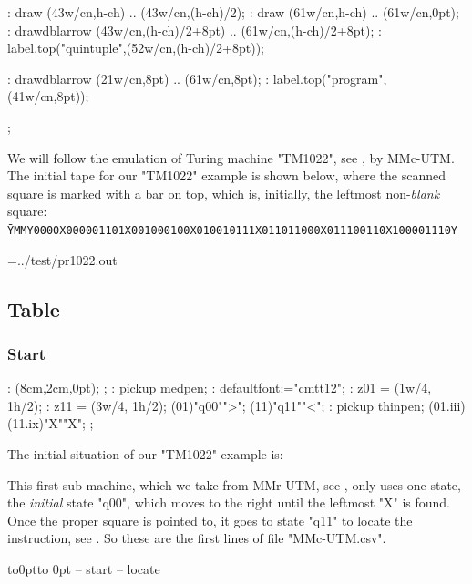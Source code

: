 \MT: draw (43w/cn,h-ch) .. (43w/cn,(h-ch)/2);
\MT: draw (61w/cn,h-ch) .. (61w/cn,0pt);
\MT: drawdblarrow  (43w/cn,(h-ch)/2+8pt) .. (61w/cn,(h-ch)/2+8pt);
\MT: label.top("quintuple",(52w/cn,(h-ch)/2+8pt));

\MT: drawdblarrow  (21w/cn,8pt) .. (61w/cn,8pt);
\MT: label.top("program",(41w/cn,8pt));

\MTendfig;

\bigskip
\centerline{\box\MTbox}
\medskip

We will follow the emulation of Turing machine "TM1022",
 see , by MMc-UTM.
The initial tape for our "TM1022" example is shown below,
where the scanned square is marked with a bar on top, which is,
initially, the leftmost non-{\em blank} square:
\smallskip\continuepar
\hbox{\qquad\tt\=YMMY0000X000001101X001000100X010010111X011011000X011100110X100001110Y}

\vfill\break

\openin\situations=../test/pr1022.out


\subsection{Table}


\subsubsection{Start}



\MT:
\MTbeginfig(8cm,2cm,0pt);
\MTresetpa;
\MT: pickup medpen;
\MT: defaultfont:="cmtt12";
\MT:  z01 = (1w/4, 1h/2);
\MT:  z11 = (3w/4, 1h/2);
\MTstate(01)"q00"">";
\MTstate(11)"q11""<";
\MT: pickup thinpen;
\MTinput(01.iii)(11.ix)"X""X";
\MTendfig;

The initial situation of our "TM1022" example is:

\nextsituation

This first sub-machine,
which we take from MMr-UTM, see ,
only uses one state, the {\em initial} state "q00",
which moves to the right until the leftmost "X" is found.
Once the proper square is pointed to,
it goes to state "q11" to locate the instruction,
see .
So these are the first lines of file "MMc-UTM.csv".
\par\kern-12pt\vbox to0pt{\kern14.4pt\hbox to 0pt{\kern5cm\box\MTbox\hss}\vss}
-- start
-- locate

